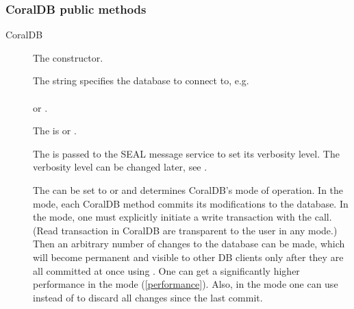 \subsubsection{CoralDB public methods}



\begin{description}
\item[CoralDB] The constructor. 

  The  string specifies the database to connect to,
  e.g.\\ \\ 
  or .
  
  The  is  or
  .

  The  is passed to the SEAL message service to set
  its verbosity level.  The verbosity level can be changed later, see
  .

  The  can be set to  or
   and determines CoralDB's mode of operation.
  In the  mode, each CoralDB method commits its
  modifications to the database.  In the  mode,
  one must explicitly initiate a write transaction with the
   call.  (Read transaction in CoralDB are
  transparent to the user in any mode.) Then an arbitrary number of
  changes to the database can be made, which will become permanent
%
%
  and visible to other DB clients only after they are all
  committed at once using .  One can get a
  significantly higher performance in the  mode
  (\ref{performance}).  Also, in the  mode one
  can use  instead of
   to discard all changes since the last
  commit.



\end{description}
